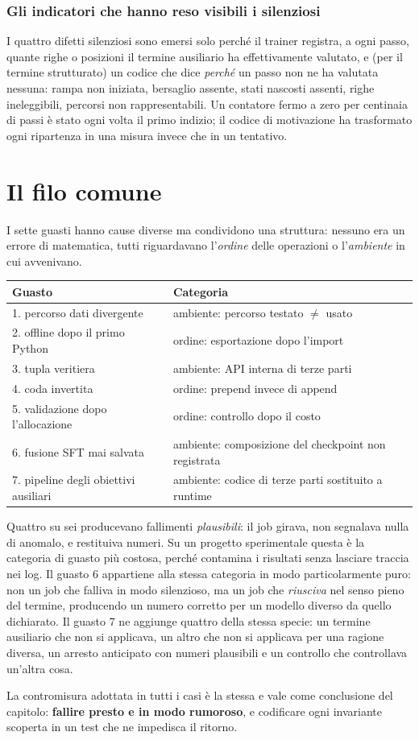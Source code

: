\subsubsection{Gli indicatori che hanno reso visibili i silenziosi}

I quattro difetti silenziosi sono emersi solo perché il trainer registra, a ogni
passo, quante righe o posizioni il termine ausiliario ha effettivamente
valutato, e (per il termine strutturato) un codice che dice \emph{perché} un
passo non ne ha valutata nessuna: rampa non iniziata, bersaglio assente, stati
nascosti assenti, righe ineleggibili, percorsi non rappresentabili. Un
contatore fermo a zero per centinaia di passi è stato ogni volta il primo
indizio; il codice di motivazione ha trasformato ogni ripartenza in una misura
invece che in un tentativo.

\section{Il filo comune}

I sette guasti hanno cause diverse ma condividono una struttura: nessuno era un
errore di matematica, tutti riguardavano l'\emph{ordine} delle operazioni o
l'\emph{ambiente} in cui avvenivano.

\begin{center}
\begin{tabular}{ll}
\toprule
Guasto & Categoria \\
\midrule
1. percorso dati divergente & ambiente: percorso testato $\neq$ usato \\
2. offline dopo il primo Python & ordine: esportazione dopo l'import \\
3. tupla veritiera & ambiente: API interna di terze parti \\
4. coda invertita & ordine: prepend invece di append \\
5. validazione dopo l'allocazione & ordine: controllo dopo il costo \\
6. fusione SFT mai salvata & ambiente: composizione del checkpoint non registrata \\
7. pipeline degli obiettivi ausiliari & ambiente: codice di terze parti sostituito a runtime \\
\bottomrule
\end{tabular}
\end{center}

Quattro su sei producevano fallimenti \emph{plausibili}: il job girava, non
segnalava nulla di anomalo, e restituiva numeri. Su un progetto sperimentale
questa è la categoria di guasto più costosa, perché contamina i risultati senza
lasciare traccia nei log. Il guasto 6 appartiene alla stessa categoria in modo
particolarmente puro: non un job che falliva in modo silenzioso, ma un job che
\emph{riusciva} nel senso pieno del termine, producendo un numero corretto per
un modello diverso da quello dichiarato. Il guasto 7 ne aggiunge quattro della
stessa specie: un termine ausiliario che non si applicava, un altro che non si
applicava per una ragione diversa, un arresto anticipato con numeri plausibili e
un controllo che controllava un'altra cosa.

La contromisura adottata in tutti i casi è la stessa e vale come conclusione del
capitolo: \textbf{fallire presto e in modo rumoroso}, e codificare ogni
invariante scoperta in un test che ne impedisca il ritorno.
